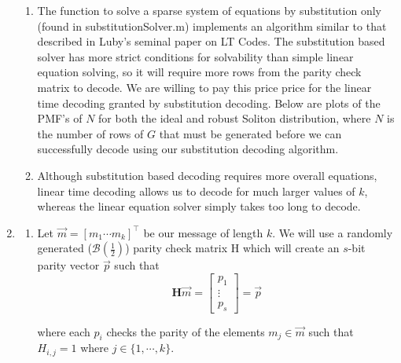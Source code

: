 \documentclass[11pt]{article}
\begin{document}
\begin{enumerate}
\begin{enumerate}
        \item The function to solve a sparse system of equations by substitution only (found in substitutionSolver.m) implements an algorithm similar to that described in Luby's seminal paper on LT Codes. The substitution based solver has more strict conditions for solvability than simple linear equation solving, so it will require more rows from the parity check matrix to decode. We are willing to pay this price price for the linear time decoding granted by substitution decoding. Below are plots of the PMF's of $N$ for both the ideal and robust Soliton distribution, where $N$ is the number of rows of $G$ that must be generated before we can successfully decode using our substitution decoding algorithm.





        \item Although substitution based decoding requires more overall equations, linear time decoding allows us to decode for much larger values of $k$, whereas the linear equation solver simply takes too long to decode.




    \end{enumerate}
    \newpage




  \item
    \begin{enumerate}

        \item Let $\vec{m} = [m_1 \cdots m_k]^\top$ be our message of length $k$. We will use a randomly generated ($\mathcal{B}(\frac{1}{2})$) parity check matrix H which will create an $s$-bit parity vector $\vec{p}$ such that
        \begin{equation*}
        \textbf{H}\vec{m} = \begin{bmatrix}
            p_1 \\
            \vdots\\
            p_s
            \end{bmatrix} = \vec{p}
        \end{equation*}

        where each $p_i$ checks the parity of the elements $m_j \in \vec{m}$ such that $H_{i,j} = 1$ where $j \in \{1, \cdots, k\}$. \newline


\end{enumerate}
\end{enumerate}
\end{document}
